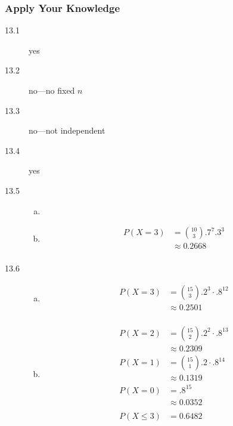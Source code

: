 \documentclass[letterpaper, landscape]{exam}
\begin{document}
  \subsubsection{Apply Your Knowledge}
  \begin{description}
    \item[13.1] yes
    \item[13.2] no---no fixed $n$
    \item[13.3] no---not independent
    \item[13.4] yes

    \item[13.5]
      \begin{enumerate}[(a)]
        \item 

        \item 
          \begin{align*}
            P(X = 3) & = \binom{10}{3} .7^7 .3^3 \\
                     & \approx \boxed{ 0.2668 } \\
          \end{align*}

      \end{enumerate}
      
    \item[13.6] 
      \begin{enumerate}[(a)]
        \item 
          \begin{align*}
            P(X = 3) & = \binom{15}{3} .2^3 \cdot .8^{12} \\
                     & \approx \boxed{ 0.2501 } \\
          \end{align*}
          
        \item 
          \begin{align*}
            P(X = 2) & = \binom{15}{2} .2^2 \cdot .8^{13} \\
                     & \approx 0.2309 \\
            P(X = 1) & = \binom{15}{1} .2 \cdot .8^{14} \\
                     & \approx 0.1319 \\
            P(X = 0) & = .8^{15} \\
                     & \approx 0.0352 \\
                     \\
            P(X \leq 3) &= \boxed{ 0.6482 } \\
          \end{align*}


\end{enumerate}
\end{description}
\end{document}

